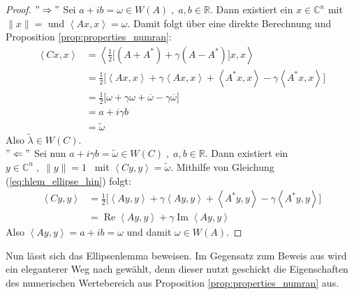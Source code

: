\begin{proof}
	$"\Rightarrow"$ Sei $a+ib=\omega \in W(A) \; , \; a, b \in \mathbb{R}$. Dann existiert ein $x \in \mathbb{C}^n$ mit $\|x\|=$ und $\left< Ax,x \right>=\omega$. Damit folgt über eine direkte Berechnung und Proposition \ref{prop:properties_numran}:
	\begin{align} \label{eq:hlem_ellipse_hin}
		\left< Cx,x \right> & = \left< \frac{1}{2} \bigg[ (A+A^*)+\gamma(A-A^*) \bigg] x, x \right> \nonumber \\
		& = \frac{1}{2} \bigg[ \left< Ax,x \right> + \gamma \left< Ax,x \right> + \left< A^*x,x \right> - \gamma \left< A^*x,x \right> \bigg] \nonumber \\
		& = \frac{1}{2} \biggl[ \omega + \gamma \omega + \overline{\omega} - \gamma \overline{\omega} \biggr] \nonumber \\
		& = a + i \gamma b \nonumber \\ 
		&= \widetilde{\omega}
	\end{align}
	Also $\widetilde{\lambda} \in W(C)$. \\

	$"\Leftarrow"$ Sei nun $a+i \gamma b=\widetilde{\omega} \in W(C) \; , \; a, b \in \mathbb{R}$. Dann existiert ein\mbox{ $y \in \mathbb{C}^n \; , \; \| y \| = 1$ } mit $\left< Cy,y \right>= \widetilde{\omega}$. Mithilfe von Gleichung (\ref{eq:hlem_ellipse_hin}) folgt:
	\begin{align}
		\left< Cy,y \right> & = \frac{1}{2} \bigg[ \left< Ay,y \right> + \gamma \left< Ay,y \right> + \left< A^*y,y \right> - \gamma \left< A^*y,y \right> \bigg] \nonumber \\
		& = \operatorname{Re} \left< Ay,y \right> + \gamma \operatorname{Im} \left< Ay,y \right> 
	\end{align}
	Also $\left< Ay,y \right> = a +ib = \omega$ und damit $\omega \in W(A)$.

\end{proof}

Nun lässt sich das Ellipsenlemma \parencite[vgl. S. 3f]{gustafson1997numerical} beweisen. Im Gegensatz zum Beweis aus \parencite{gustafson1997numerical} wird ein eleganterer Weg nach \parencite{li1996simple_ellipse} gewählt, denn dieser nutzt geschickt die Eigenschaften des numerischen Wertebereich aus Proposition \ref{prop:properties_numran} aus.

